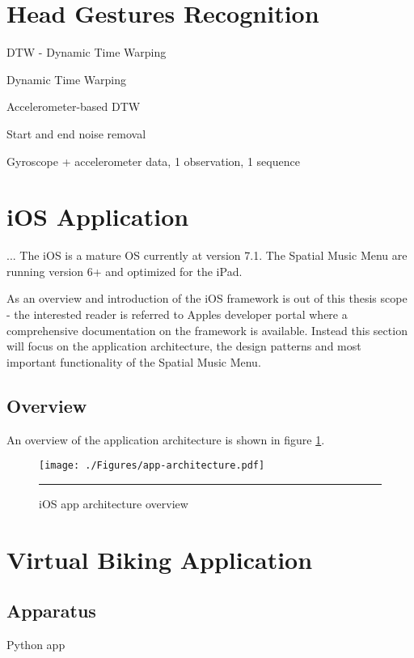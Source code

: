 \section{Head Gestures Recognition}

DTW - Dynamic Time Warping 

Dynamic Time Warping \cite{salvador_toward_2007}

Accelerometer-based DTW \cite{akl_accelerometer-based_2010}

Start and end noise removal

Gyroscope + accelerometer data, 1 observation, 1 sequence


\section{iOS Application}
...
The iOS is a mature OS currently at version 7.1. The Spatial Music Menu are running version 6+ and optimized for the iPad.

As an overview and introduction of the iOS framework is out of this thesis scope - the interested reader is referred to Apples developer portal \cite{apple_apple_2014} where a comprehensive documentation on the framework is available. Instead this section will focus on the application architecture, the design patterns and most important functionality of the Spatial Music Menu.

\subsection{Overview}
An overview of the application architecture is shown in figure \ref{fig:apparchitecture}.

\begin{figure}[htbp]
	\centering
		\texttt{[image: ./Figures/app-architecture.pdf]}
		\rule{35em}{1pt}
	\caption[App architecture]{iOS app architecture overview}
	\label{fig:apparchitecture}
\end{figure}


\section{Virtual Biking Application}

\subsection{Apparatus}

Python app





